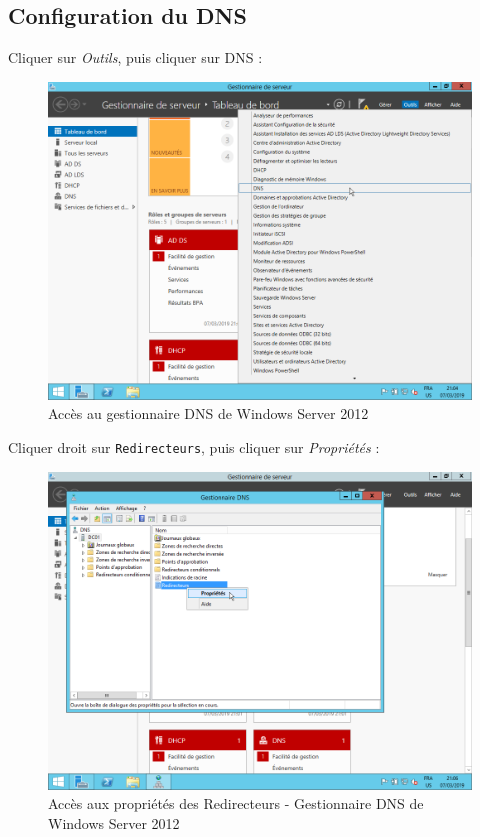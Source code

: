 \newpage
\subsection{Configuration du DNS}

Cliquer sur \textit{Outils}, puis cliquer sur DNS :
\begin{figure}[h!]
    \begin{center}
        \includegraphics[scale=0.6]{WS2012_Screenshots/34.png}
        \caption{Accès au gestionnaire DNS de Windows Server 2012}
        \label{WS2012_Screenshots/34}
    \end{center}
\end{figure}
\FloatBarrier

\newpage
Cliquer droit sur \texttt{Redirecteurs}, puis cliquer sur \textit{Propriétés} :
\begin{figure}[h!]
    \begin{center}
        \includegraphics[scale=0.6]{WS2012_Screenshots/35.png}
        \caption{Accès aux propriétés des Redirecteurs - Gestionnaire DNS de Windows Server 2012}
        \label{WS2012_Screenshots/35}
    \end{center}
\end{figure}
\FloatBarrier

